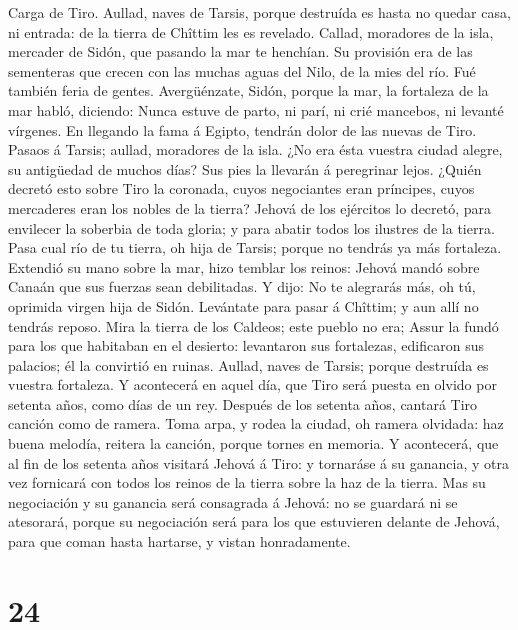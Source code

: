  Carga de Tiro. Aullad, naves de Tarsis, porque destruída es
hasta no quedar casa, ni entrada: de la tierra de Chîttim les es
revelado.  Callad, moradores de la isla, mercader de Sidón,
que pasando la mar te henchían.  Su provisión era de las
sementeras que crecen con las muchas aguas del Nilo, de la mies del río.
Fué también feria de gentes.  Avergüénzate, Sidón, porque la
mar, la fortaleza de la mar habló, diciendo: Nunca estuve de parto, ni
parí, ni crié mancebos, ni levanté vírgenes.  En llegando la
fama á Egipto, tendrán dolor de las nuevas de Tiro.  Pasaos
á Tarsis; aullad, moradores de la isla.  ¿No era ésta
vuestra ciudad alegre, su antigüedad de muchos días? Sus pies la
llevarán á peregrinar lejos.  ¿Quién decretó esto sobre Tiro
la coronada, cuyos negociantes eran príncipes, cuyos mercaderes eran los
nobles de la tierra?  Jehová de los ejércitos lo decretó,
para envilecer la soberbia de toda gloria; y para abatir todos los
ilustres de la tierra.  Pasa cual río de tu tierra, oh hija
de Tarsis; porque no tendrás ya más fortaleza.  Extendió su
mano sobre la mar, hizo temblar los reinos: Jehová mandó sobre Canaán
que sus fuerzas sean debilitadas.  Y dijo: No te alegrarás
más, oh tú, oprimida virgen hija de Sidón. Levántate para pasar á
Chîttim; y aun allí no tendrás reposo.  Mira la tierra de
los Caldeos; este pueblo no era; Assur la fundó para los que habitaban
en el desierto: levantaron sus fortalezas, edificaron sus palacios; él
la convirtió en ruinas.  Aullad, naves de Tarsis; porque
destruída es vuestra fortaleza.  Y acontecerá en aquel día,
que Tiro será puesta en olvido por setenta años, como días de un rey.
Después de los setenta años, cantará Tiro canción como de ramera.
 Toma arpa, y rodea la ciudad, oh ramera olvidada: haz
buena melodía, reitera la canción, porque tornes en memoria.
 Y acontecerá, que al fin de los setenta años visitará
Jehová á Tiro: y tornaráse á su ganancia, y otra vez fornicará con todos
los reinos de la tierra sobre la haz de la tierra.  Mas su
negociación y su ganancia será consagrada á Jehová: no se guardará ni se
atesorará, porque su negociación será para los que estuvieren delante de
Jehová, para que coman hasta hartarse, y vistan honradamente.

\hypertarget{section-23}{%
\section{24}\label{section-23}}


